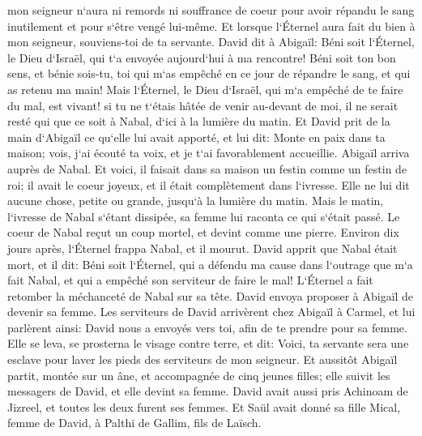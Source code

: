 \verse mon seigneur n`aura ni remords ni souffrance de coeur pour avoir répandu le sang inutilement et pour s`être vengé lui-même. Et lorsque l`Éternel aura fait du bien à mon seigneur, souviens-toi de ta servante. 
\verse David dit à Abigaïl: Béni soit l`Éternel, le Dieu d`Israël, qui t`a envoyée aujourd`hui à ma rencontre! 
\verse Béni soit ton bon sens, et bénie sois-tu, toi qui m`as empêché en ce jour de répandre le sang, et qui as retenu ma main! 
\verse Mais l`Éternel, le Dieu d`Israël, qui m`a empêché de te faire du mal, est vivant! si tu ne t`étais hâtée de venir au-devant de moi, il ne serait resté qui que ce soit à Nabal, d`ici à la lumière du matin. 
\verse Et David prit de la main d`Abigaïl ce qu`elle lui avait apporté, et lui dit: Monte en paix dans ta maison; vois, j`ai écouté ta voix, et je t`ai favorablement accueillie. 
\verse Abigaïl arriva auprès de Nabal. Et voici, il faisait dans sa maison un festin comme un festin de roi; il avait le coeur joyeux, et il était complètement dans l`ivresse. Elle ne lui dit aucune chose, petite ou grande, jusqu`à la lumière du matin. 
\verse Mais le matin, l`ivresse de Nabal s`étant dissipée, sa femme lui raconta ce qui s`était passé. Le coeur de Nabal reçut un coup mortel, et devint comme une pierre. 
\verse Environ dix jours après, l`Éternel frappa Nabal, et il mourut. 
\verse David apprit que Nabal était mort, et il dit: Béni soit l`Éternel, qui a défendu ma cause dans l`outrage que m`a fait Nabal, et qui a empêché son serviteur de faire le mal! L`Éternel a fait retomber la méchanceté de Nabal sur sa tête. David envoya proposer à Abigaïl de devenir sa femme. 
\verse Les serviteurs de David arrivèrent chez Abigaïl à Carmel, et lui parlèrent ainsi: David nous a envoyés vers toi, afin de te prendre pour sa femme. 
\verse Elle se leva, se prosterna le visage contre terre, et dit: Voici, ta servante sera une esclave pour laver les pieds des serviteurs de mon seigneur. 
\verse Et aussitôt Abigaïl partit, montée sur un âne, et accompagnée de cinq jeunes filles; elle suivit les messagers de David, et elle devint sa femme. 
\verse David avait aussi pris Achinoam de Jizreel, et toutes les deux furent ses femmes. 
\verse Et Saül avait donné sa fille Mical, femme de David, à Palthi de Gallim, fils de Laïsch. 

